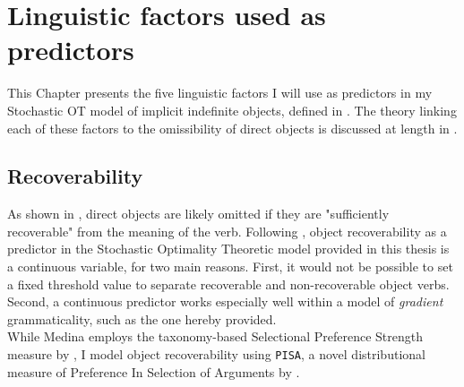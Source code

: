 \setchapterpreamble[u]{\margintoc}
\chapter{Linguistic factors used as predictors}

This Chapter presents the five linguistic factors I will use as predictors in my Stochastic OT model of implicit indefinite objects, defined in . The theory linking each of these factors to the omissibility of direct objects is discussed at length in .


\section{Recoverability} 



As shown in , direct objects are likely omitted if they are "sufficiently recoverable" \parencite{Glass2013} from the meaning of the verb. Following \textcite{Medina2007}, object recoverability as a predictor in the Stochastic Optimality Theoretic model provided in this thesis is a continuous variable, for two main reasons. First, it would not be possible to set a fixed threshold value to separate recoverable and non-recoverable object verbs. Second, a continuous predictor works especially well within a model of \textit{gradient} grammaticality, such as the one hereby provided.\\
While Medina employs the taxonomy-based Selectional Preference Strength measure by \textcite{Resnik1993, Resnik1996}, I model object recoverability using \texttt{PISA}, a novel distributional measure of Preference In Selection of Arguments by \textcite{CappelliLenciPISA}.

